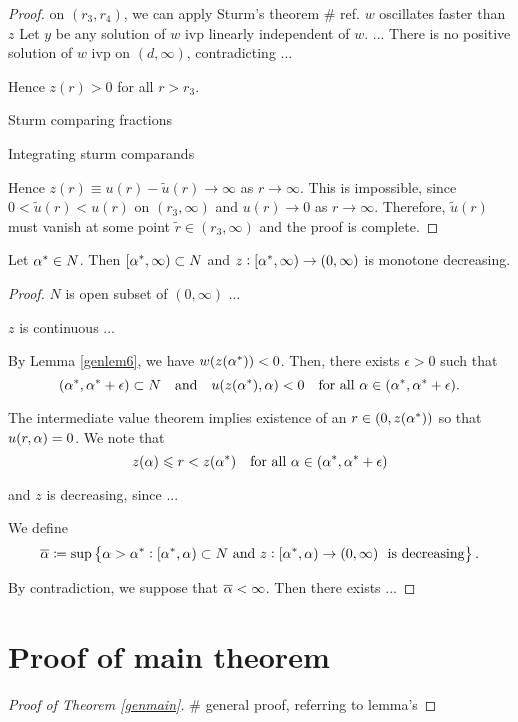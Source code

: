 \begin{proof}
on $(r_3, r_4)$, we can apply Sturm's theorem \# ref. {\red $w$ oscillates
faster than $z$} Let $y$ be any solution of $w$ ivp linearly independent of
$w$. ... There is no positive solution of $w$ ivp on $(d, \infty)$,
contradicting ...

Hence $z(r) > 0$ for all $r > r_3$. %

Sturm comparing fractions

Integrating sturm comparands

Hence $z(r) \equiv u(r) - \tilde{u}(r) \to \infty$ as $r \to \infty$. This is
impossible, since $0 < \tilde{u}(r) < u(r)$ on $(r_3, \infty)$ and $u(r) \to 0$
as $r \to \infty$. Therefore, $\tilde{u}(r)$ must vanish at some point
$\tilde{r} \in (r_3, \infty)$ and the proof is complete.

\end{proof}

\begin{lemma}\label{genlem8}
Let $\alpha^{*} \in N$. Then $\left[ \alpha^{*}, \infty \right) \subset N$ and $z : \left[
\alpha^{*}, \infty \right) \to (0, \infty)$ is monotone decreasing.
\end{lemma}
\begin{proof}
$N$ is open subset of $(0, \infty)$ ...

$z$ is continuous ...

By Lemma \ref{genlem6}, we have $w(z(\alpha^{*})) < 0$. Then, there exists $\epsilon >
0$ such that
\[ (\alpha^{*}, \alpha^{*} + \epsilon) \subset N\quad\text{and}\quad u(z(\alpha^{*}), \alpha) < 0\quad
\text{for all} ~ \alpha \in (\alpha^{*}, \alpha^{*} + \epsilon). \]

The intermediate value theorem implies existence of an $r \in (0, z(\alpha^{*}))$ so
that $u(r, \alpha) = 0$. We note that 
\[ z(\alpha) \leqslant r < z(\alpha^{*})\quad\text{for all} ~ \alpha \in (\alpha^{*}, \alpha^{*} + \epsilon) \]

and $z$ is decreasing, since ...

We define
\[ \overline{\alpha} \coloneqq \sup \left\{ \alpha > \alpha^{*} : \left[ \alpha^{*}, \alpha \right) \subset N ~
\text{and} ~ z : \left[ \alpha^{*}, \alpha \right) \to (0, \infty) ~ \text{ is decreasing}
\right\}. \]


By contradiction, we suppose that $\overline{\alpha} < \infty$. Then there exists ...
\end{proof}

\section{Proof of main theorem}
\begin{proof}[Proof of Theorem \ref{genmain}]
\# general proof, referring to lemma's
\end{proof}

